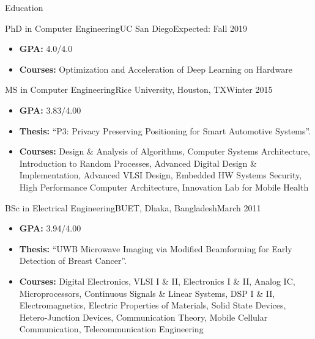 \documentclass[]{mcdowellcv}
\begin{document}
	\begin{cvsection}{Education}
		\begin{cvsubsection}{PhD in Computer Engineering}{UC San Diego}{Expected: Fall 2019}
			\begin{itemize}
				\item \textbf{GPA:} 4.0/4.0
				\item \textbf{Courses:} Optimization and Acceleration of Deep Learning on Hardware
			\end{itemize}
		\end{cvsubsection}	
		
		\begin{cvsubsection}{MS in Computer Engineering}{Rice University, Houston, TX}{Winter 2015}
			\begin{itemize}
				\item \textbf{GPA:} 3.83/4.00
				\item \textbf{Thesis:} ``P3: Privacy Preserving Positioning for Smart Automotive Systems''.
				\item \textbf{Courses:} Design \& Analysis of Algorithms, Computer Systems Architecture, Introduction to Random Processes, Advanced Digital Design \& Implementation, Advanced VLSI Design, Embedded HW Systems Security, High Performance Computer Architecture, Innovation Lab for Mobile Health
			\end{itemize}
		\end{cvsubsection}
		
		\begin{cvsubsection}{BSc in Electrical Engineering}{BUET, Dhaka, Bangladesh}{March 2011}
			\begin{itemize}
				\item \textbf{GPA:} 3.94/4.00
				\item \textbf{Thesis:} ``UWB Microwave Imaging via Modified Beamforming for Early Detection of Breast Cancer''.
				\item \textbf{Courses:} Digital Electronics, VLSI I \& II, Electronics I \& II, Analog IC, Microprocessors, Continuous Signals \& Linear Systems, DSP I \& II, Electromagnetics, Electric Properties of Materials, Solid State Devices, Hetero-Junction Devices, Communication Theory, Mobile Cellular Communication, Telecommunication Engineering
			\end{itemize}
		\end{cvsubsection}
	\end{cvsection}
	
\end{document}
